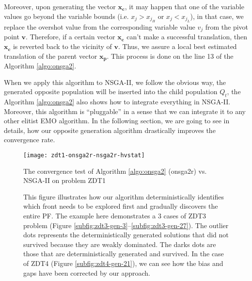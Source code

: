 \documentclass{sig-alternate-05-2015}
\begin{document}
Moreover, upon generating the vector \(\mathbf{x_c}\), it may happen that one of the variable values go beyond the variable bounds (i.e. \(x_j > x_{j_H}\) or \(x_j < x_{j_L}\)), in that case, we replace the overshot value from the corresponding variable value \(v_j\) from the pivot point \(\mathbf{v}\). Therefore, if a certain vector \(\mathbf{x_c}\) can't make a successful translation, then \(\mathbf{x_c}\) is reverted back to the vicinity of \(\mathbf{v}\). Thus, we assure a local best estimated translation of the parent vector \(\mathbf{x_p}\). This process is done on the line 13 of the Algorithm \ref{algo:onsga2}.

When we apply this algorithm to NSGA-II, we follow the obvious way, the generated opposite population will be inserted into the child population \(Q_t\), the Algorithm \ref{algo:onsga2} also shows how to integrate everything in NSGA-II. Moreover, this algorithm is ``pluggable'' in a sense that we can integrate it to any other elitist EMO algorithm. In the following section, we are going to see in details, how our opposite generation algorithm drastically improves the convergence rate.

\begin{figure}[tp!]
	\centering
	\texttt{[image: zdt1-onsga2r-nsga2r-hvstat]}
	\caption{The convergence test of Algorithm \ref{algo:onsga2} (onsga2r) vs. NSGA-II on problem ZDT1}
	\label{plot:zdt1-onsga2r}
\end{figure}
%
%
\begin{figure*}[tp!]
	\centering
	\hfill
		\caption{This figure illustrates how our algorithm deterministically identifies which front needs to be explored first and gradually discovers the entire PF. The example here demonstrates a 3 cases of ZDT3 problem (Figure \ref{subfig:zdt3-gen-3}--\ref{subfig:zdt3-gen-27}). The outlier dots represents the deterministically generated solutions that did not survived because they are weakly dominated. The darks dots are those that are deterministically generated and survived. In the case of ZDT4 (Figure \ref{subfig:zdt4-gen-21}), we can see how the bias and gaps have been corrected by our approach.}
	\label{fig:zdt3-gap}
\end{figure*}
%
\end{document}
